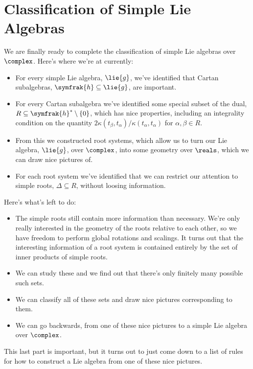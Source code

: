 \documentclass[fleqn]{NotesClass}
\newcommand{\csa}{\symfrak{h}}
\begin{document}
    \chapter{Classification of Simple Lie Algebras}
    We are finally ready to complete the classification of simple Lie algebras over \(\complex\).
    Here's where we're at currently:
    \begin{itemize}
        \item For every simple Lie algebra, \(\lie{g}\), we've identified that Cartan subalgebras, \(\csa \subseteq \lie{g}\), are important.
        \item For every Cartan subalgebra we've identified some special subset of the dual, \(R \subseteq \csa^*\setminus\{0\}\), which has nice properties, including an integrality condition on the quantity \(2\kappa(t_\beta, t_\alpha)/\kappa(t_\alpha, t_\alpha)\) for \(\alpha, \beta \in R\).
        \item From this we constructed root systems, which allow us to turn our Lie algebra, \(\lie{g}\), over \(\complex\), into some geometry over \(\reals\), which we can draw nice pictures of.
        \item For each root system we've identified that we can restrict our attention to simple roots, \(\Delta \subseteq R\), without loosing information.
    \end{itemize}
    Here's what's left to do:
    \begin{itemize}
        \item The simple roots still contain more information than necessary.
        We're only really interested in the geometry of the roots relative to each other, so we have freedom to perform global rotations and scalings.
        It turns out that the interesting information of a root system is contained entirely by the set of inner products of simple roots.
        \item We can study these and we find out that there's only finitely many possible such sets.
        \item We can classify all of these sets and draw nice pictures corresponding to them.
        \item We can go backwards, from one of these nice pictures to a simple Lie algebra over \(\complex\).
    \end{itemize}
    This last part is important, but it turns out to just come down to a list of rules for how to construct a Lie algebra from one of these nice pictures.
     
\end{document}
